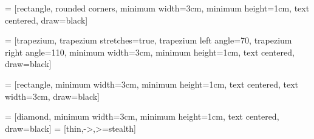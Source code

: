 \usepackage{tikz}
\usetikzlibrary{shapes.geometric, arrows}

 = [rectangle, rounded corners,
minimum width=3cm,
minimum height=1cm,
text centered,
draw=black]

 = [trapezium,
trapezium stretches=true,
trapezium left angle=70,
trapezium right angle=110,
minimum width=3cm,
minimum height=1cm, text centered,
draw=black]

 = [rectangle,
minimum width=3cm,
minimum height=1cm,
text centered,
text width=3cm,
draw=black]

 = [diamond,
minimum width=3cm,
minimum height=1cm,
text centered,
draw=black]
 = [thin,->,>=stealth]